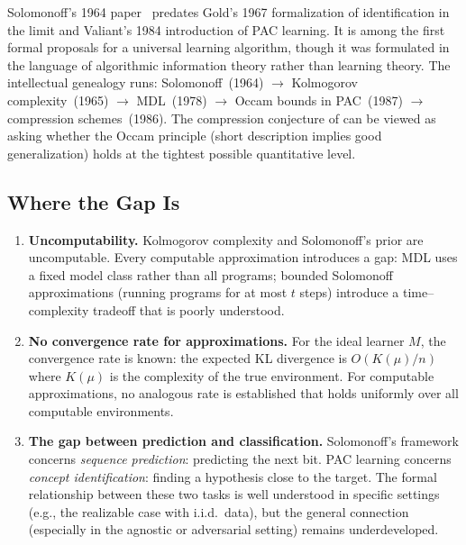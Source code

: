 \begin{historical}
Solomonoff's 1964 paper~\cite{Solomonoff1964} predates Gold's 1967
formalization of identification in the limit and Valiant's 1984
introduction of PAC learning.  It is among the first formal proposals
for a universal learning algorithm, though it was formulated in the language
of algorithmic information theory rather than learning theory.  The
intellectual genealogy runs:
Solomonoff~(1964) $\to$ Kolmogorov complexity~(1965) $\to$ MDL~(1978)
$\to$ Occam bounds in PAC~(1987) $\to$ compression schemes~(1986).
The compression conjecture of  can be
viewed as asking whether the Occam principle (short description implies
good generalization) holds at the tightest possible quantitative level.
\end{historical}

\subsection{Where the Gap Is}

\begin{enumerate}[leftmargin=*]
\item \textbf{Uncomputability.}  Kolmogorov complexity and Solomonoff's
  prior are uncomputable.  Every computable approximation introduces a
  gap: MDL uses a fixed model class rather than all programs; bounded
  Solomonoff approximations (running programs for at most $t$ steps)
  introduce a time--complexity tradeoff that is poorly understood.

\item \textbf{No convergence rate for approximations.}  For the ideal
  learner $M$, the convergence rate is known: the expected KL divergence
  is $O(K(\mu)/n)$ where $K(\mu)$ is the complexity of the true
  environment.  For computable approximations, no analogous rate is
  established that holds uniformly over all computable environments.

\item \textbf{The gap between prediction and classification.}  Solomonoff's
  framework concerns \emph{sequence prediction}: predicting the next bit.
  PAC learning concerns \emph{concept identification}: finding a hypothesis
  close to the target.  The formal relationship between these two tasks
  is well understood in specific settings (e.g., the realizable case with
  i.i.d.\ data), but the general connection (especially in the agnostic
  or adversarial setting) remains underdeveloped.
\end{enumerate}

